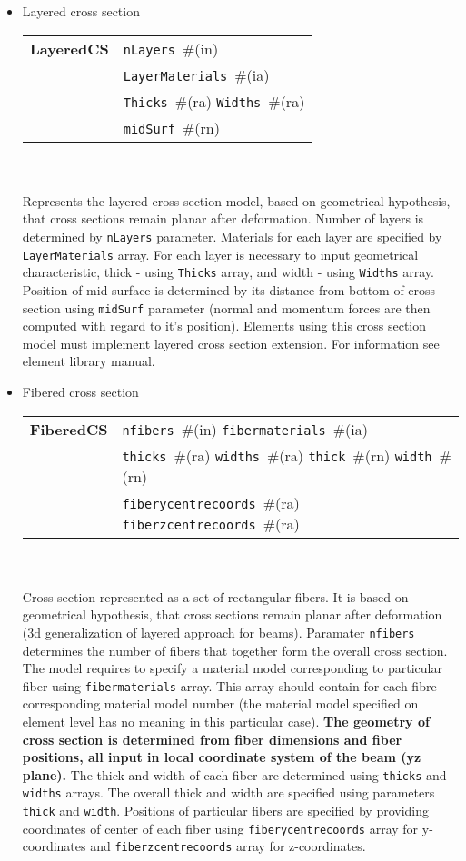 \documentclass[a4paper]{report}
\newcommand{\param}[1]{\texttt{#1}} %
\newcommand{\field}[2]{\param{#1}~\#{\tiny(#2)}} %
\newcommand{\entKeywordInst}[1]{\textbf{#1}} %
\newenvironment{record}[1][]{\begin{tabular}{|ll}}{\end{tabular}\\}
\newcommand{\recentry}[2]{{#1}&{#2}\\}
\newcounter{rcc}
\newenvironment{record}[1][\textwidth]{\setcounter{rcc}{0}\rowcolors{1}{lightgray}{lightgray}\tabularx{#1}{llR} \hline}
               {\endtabularx}
\newcommand{\recentry}[2]{\ifthenelse{\value{rcc}>0}{$\backslash$ \\}{\setcounter{rcc}{1}}{#1}&{#2}&}
\begin{document}
\begin{itemize}
\item
Layered cross section \\
\begin{record}[0.9\textwidth]
  \recentry{\entKeywordInst{LayeredCS}}{\field{nLayers}{in}}
  \recentry{}{\field{LayerMaterials}{ia}}
  \recentry{}{\field{Thicks}{ra} \field{Widths}{ra}}
  \recentry{}{\field{mid\-Surf}{rn}}
\end{record}\\
Represents the layered cross section model, based on
geometrical hypothesis, that cross sections remain planar after
deformation. Number of layers is
determined by \param{nLayers} parameter. Materials for each
layer are specified by \param{LayerMaterials} array. For each layer is
necessary to input
geometrical characteristic, thick - using \param{Thicks} array, and
width - using
\param{Widths} array. Position of mid surface is determined by its
distance from
bottom of cross section using \param{mid\-Surf} parameter (normal and
momentum forces are then computed with regard to it's position).
Elements using this cross section model must implement layered cross
section extension. For information see element library manual.
\item
Fibered cross section\\
\begin{record}[0.9\textwidth]
  \recentry{\entKeywordInst{FiberedCS}}{\field{nfibers}{in} \field{fibermaterials}{ia}}
  \recentry{}{\field{thicks}{ra} \field{widths}{ra} \field{thick}{rn} \field{width}{rn}}
  \recentry{}{\field{fiberycentrecoords}{ra} \field{fiberzcentrecoords}{ra}}
\end{record}\\
Cross section represented as a set of rectangular fibers. It is based on
geometrical hypothesis, that cross sections remain planar after
deformation (3d generalization of layered approach for beams).
Paramater \param{nfibers} determines the number of fibers that together form the overall cross section.
The model requires to specify a material model corresponding to particular fiber using \param{fibermaterials} array. This array should contain for each fibre corresponding material model number (the material model specified on element level has no meaning in this particular case).
\textbf{The geometry of cross section is determined from fiber dimensions and fiber positions, all input in local coordinate system of the beam (yz plane).} The thick and width of each fiber are determined using \param{thicks} and \param{widths} arrays. The overall thick and width are specified using parameters \param{thick} and \param{width}. Positions of particular fibers are specified by providing coordinates of center of each fiber using \param{fiberycentrecoords} array for y-coordinates and \param{fiberzcentrecoords} array for z-coordinates.


\end{itemize}
\end{document}
